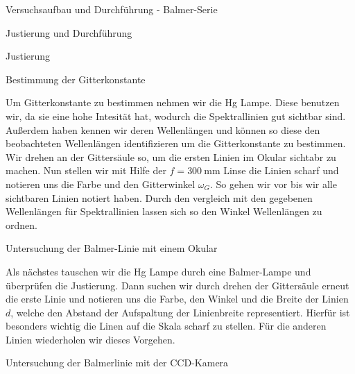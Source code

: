 \documentclass[pdftex, a4paper,11pt, twoside, ngerman]{report}
\begin{document}
\begin{chapter}{Versuchsaufbau und Durchführung - Balmer-Serie}
\begin{section}{Justierung und Durchführung}
\begin{subsection}{Justierung}
      \end{subsection}
      
      \begin{subsection}{Bestimmung der Gitterkonstante}

        Um Gitterkonstante zu bestimmen nehmen wir die Hg Lampe. Diese benutzen wir, da sie eine hohe Intesität hat, wodurch die Spektrallinien gut sichtbar sind. Außerdem haben kennen wir deren Wellenlängen und können so diese den beobachteten Wellenlängen identifizieren um die Gitterkonstante zu bestimmen. Wir drehen an der Gittersäule so, um die ersten Linien im Okular sichtabr zu machen. Nun stellen wir mit Hilfe der $f=\SI{300}{\milli\meter}$ Linse die Linien scharf und notieren uns die Farbe und den Gitterwinkel $\omega_G$. So gehen wir vor bis wir alle sichtbaren Linien notiert haben. Durch den vergleich mit den gegebenen Wellenlängen für Spektrallinien lassen sich so den Winkel Wellenlängen zu ordnen.
        

      \end{subsection}
      
      \begin{subsection}{Untersuchung der Balmer-Linie mit einem Okular}

        Als nächstes tauschen wir die Hg Lampe durch eine Balmer-Lampe und überprüfen die Justierung. Dann suchen wir durch drehen der Gittersäule erneut die erste Linie und notieren uns die Farbe, den Winkel und die Breite der Linien $d$, welche den Abstand der Aufspaltung der Linienbreite representiert. Hierfür ist besonders wichtig die Linen auf die Skala scharf zu stellen. Für die anderen Linien wiederholen wir dieses Vorgehen.
          

      \end{subsection}
      
      \begin{subsection}{Untersuchung der Balmerlinie mit der CCD-Kamera}


\end{subsection}
\end{section}
\end{chapter}
\end{document}
